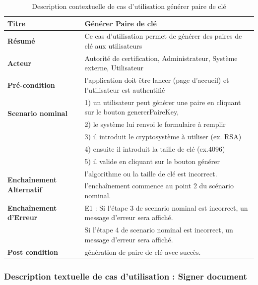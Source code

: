 \documentclass[12pt,a4paper]{article}
\begin{document}
				\begin{table}[H]
			
				\centering
					\caption{Description contextuelle de cas d'utilisation générer paire de clé}
				\begin{tabular}{|l|p{11cm}|}
					\hline 
						\textbf{Titre} & Générer Paire de clé \\ 
					\hline 
						\textbf{Résumé} & Ce cas d'utilisation permet de générer des paires de clé aux utilisateurs \\ 
					\hline 
						\textbf{Acteur} & Autorité de certification, Administrateur, Système externe, Utilisateur \\  
					\hline 
						\textbf{Pré-condition} & l'application doit être lancer (page d'accueil) et l'utilisateur est authentifié \\ 
					\hline 
						\multirow{2}{*}{\textbf{Scenario nominal}} & 1) un utilisateur peut générer une paire en cliquant sur le bouton genererPaireKey, \\
							 & 2) le système lui renvoi le formulaire à remplir \\
							 & 3) il introduit le cryptosystème à utiliser (ex. RSA) \\
							 & 4) ensuite il introduit la taille de clé (ex.4096) \\
							 & 5) il valide en cliquant sur le bouton générer \\
					\hline 
					
						\multirow{2}{*}{\textbf{Enchaînement Alternatif}} & l'algorithme ou la taille de clé est incorrect. \\
							  & l'enchaînement commence au point 2 du scénario nominal. \\
							
					\hline 
						\textbf{Enchaînement d'Erreur} & E1 : Si l'étape 3 de scenario nominal est incorrect, un message d'erreur sera affiché. \\
						& Si l'étape 4 de scenario nominal est incorrect, un message d'erreur sera affiché. \\
					\hline
						\textbf{Post condition} & génération de paire de clé avec succès.\\
					\hline
				
			\end{tabular} 
			
		\end{table}
		
	\subsubsection{Description textuelle de cas d'utilisation : Signer document}
\end{document}
